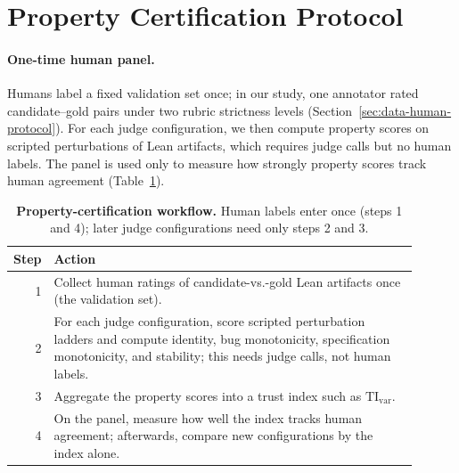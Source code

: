 \section{Property Certification Protocol}\label{sec:property-protocol}
\paragraph{One-time human panel.}
Humans label a fixed validation set once; in our study, one annotator rated candidate--gold pairs under two rubric strictness levels (Section~\ref{sec:data-human-protocol}).
For each judge configuration, we then compute property scores on scripted perturbations of Lean artifacts, which requires judge calls but no human labels.
The panel is used only to measure how strongly property scores track human agreement (Table~\ref{tab:protocol_workflow}).

\begin{table}[t]
  \centering
  \small
  \begin{tabular}{@{}r@{\kern 7pt}>{\raggedright\arraybackslash}p{0.9\linewidth}@{}}
    \toprule
    \textbf{Step} & \textbf{Action} \\
    \midrule
    1 & Collect human ratings of candidate-vs.-gold Lean artifacts once (the validation set). \\
    2 & For each judge configuration, score scripted perturbation ladders and compute identity, bug monotonicity, specification monotonicity, and stability; this needs judge calls, not human labels. \\
    3 & Aggregate the property scores into a trust index such as \(\mathrm{TI}_{\mathrm{var}}\). \\
    4 & On the panel, measure how well the index tracks human agreement; afterwards, compare new configurations by the index alone. \\
    \bottomrule
  \end{tabular}
  \caption{\textbf{Property-certification workflow.} Human labels enter once (steps 1 and 4); later judge configurations need only steps 2 and 3.}
  \label{tab:protocol_workflow}
\end{table}

